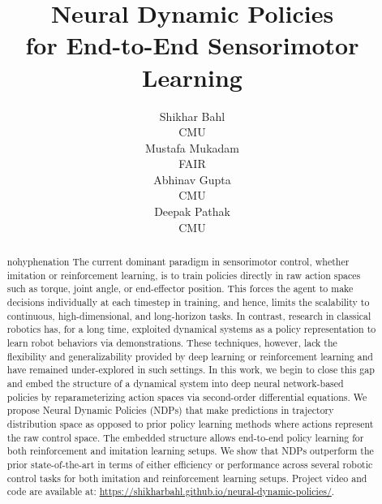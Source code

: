 \documentclass{article}
\title{Neural Dynamic Policies\\for End-to-End Sensorimotor Learning}
\author{Shikhar Bahl\\
CMU\\
\And
Mustafa Mukadam \\
FAIR\\
\And
Abhinav Gupta \\
CMU\\
\And
Deepak Pathak \\
CMU\\
}
\begin{document}
\maketitle

\begin{abstract}
\begin{hyphenrules}{nohyphenation}
The current dominant paradigm in sensorimotor control, whether imitation or reinforcement learning, is to train policies directly in raw action spaces such as torque, joint angle, or end-effector position. This forces the agent to make decisions individually at each timestep in training, and hence, limits the scalability to continuous, high-dimensional, and long-horizon tasks. In contrast, research in classical robotics has, for a long time, exploited dynamical systems as a policy representation to learn robot behaviors via demonstrations. These techniques, however, lack the flexibility and generalizability provided by deep learning or reinforcement learning and have remained under-explored in such settings. In this work, we begin to close this gap and embed the structure of a dynamical system into deep neural network-based policies by reparameterizing action spaces via second-order differential equations. We propose Neural Dynamic Policies (NDPs) that make predictions in trajectory distribution space as opposed to prior policy learning methods where actions represent the raw control space. The embedded structure allows end-to-end policy learning for both reinforcement and imitation learning setups. We show that NDPs outperform the prior state-of-the-art in terms of either efficiency or performance across several robotic control tasks for both imitation and reinforcement learning setups. Project video and code are available at: \url{https://shikharbahl.github.io/neural-dynamic-policies/}.
\end{hyphenrules}
\end{abstract}
\end{document}
